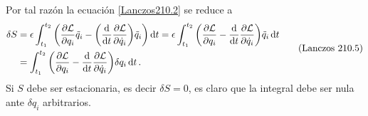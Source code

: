 \documentclass[12pt, spanish, a4paper, ]{article}
\begin{document}
Por tal razón la ecuación \eqref{Lanczos210.2} se reduce a 
\begin{equation}\label{Lanczos210.5}
	\begin{aligned}
    \delta S &= 
    \epsilon \int_{t_1}^{t_2 } \pqty{\pdv{\mathcal{L}}{q_i} \tilde{q}_i - \pqty{ \dv{t} \pdv{\mathcal{L}}{\dot{q}_i} } \tilde{q}_i } \dd{t} = 
    \epsilon \int_{t_1}^{t_2 } \pqty{\pdv{\mathcal{L}}{q_i} - \dv{t} \pdv{\mathcal{L}}{\dot{q}_i} } \tilde{q}_i \dd{t} \\
		&= \int_{t_1}^{t_2 } \pqty{\pdv{\mathcal{L}}{q_i} - \dv{t} \pdv{\mathcal{L}}{\dot{q}_i} } \delta q_i \dd{t}.
	\end{aligned}
	\tag{Lanczos 210.5}
\end{equation}
Si \(S\) debe ser estacionaria, es decir \(\delta S = 0\), es claro que la integral debe ser nula ante \(\delta q_i\) arbitrarios.
\end{document}
